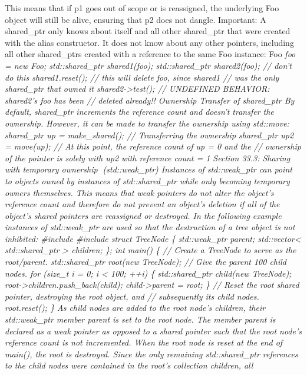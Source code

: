 This means that if p1 goes out of scope or is reassigned, the underlying
Foo object will still be alive, ensuring that p2 does not dangle.
Important: A shared\_ptr only knows about itself and all other
shared\_ptr that were created with the alias constructor. It does not
know about any other pointers, including all other shared\_ptrs created
with a reference to the same Foo instance: Foo \emph{foo = new Foo;
std::shared\_ptr shared1(foo); std::shared\_ptr shared2(foo); // don't
do this shared1.reset(); // this will delete foo, since shared1 // was
the only shared\_ptr that owned it shared2-\textgreater test(); //
UNDEFINED BEHAVIOR: shared2's foo has been // deleted already!!
Ownership Transfer of shared\_ptr By default, shared\_ptr increments the
reference count and doesn't transfer the ownership. However, it can be
made to transfer the ownership using std::move: shared\_ptr up =
make\_shared(); // Transferring the ownership shared\_ptr up2 =
move(up); // At this point, the reference count of up = 0 and the //
ownership of the pointer is solely with up2 with reference count = 1
Section 33.3: Sharing with temporary ownership (std::weak\_ptr)
Instances of std::weak\_ptr can point to objects owned by instances of
std::shared\_ptr while only becoming temporary owners themselves. This
means that weak pointers do not alter the object's reference count and
therefore do not prevent an object's deletion if all of the object's
shared pointers are reassigned or destroyed. In the following example
instances of std::weak\_ptr are used so that the destruction of a tree
object is not inhibited: \#include \#include struct TreeNode \{
std::weak\_ptr parent; std::vector\textless{} std::shared\_ptr
\textgreater{} children; \}; int main() \{ // Create a TreeNode to serve
as the root/parent. std::shared\_ptr root(new TreeNode); // Give the
parent 100 child nodes. for (size\_t i = 0; i \textless{} 100; ++i) \{
std::shared\_ptr child(new TreeNode);
root-\textgreater children.push\_back(child); child-\textgreater parent
= root; \} // Reset the root shared pointer, destroying the root object,
and // subsequently its child nodes. root.reset(); \} As child nodes are
added to the root node's children, their std::weak\_ptr member parent is
set to the root node. The member parent is declared as a weak pointer as
opposed to a shared pointer such that the root node's reference count is
not incremented. When the root node is reset at the end of main(), the
root is destroyed. Since the only remaining std::shared\_ptr references
to the child nodes were contained in the root's collection children, all
}
